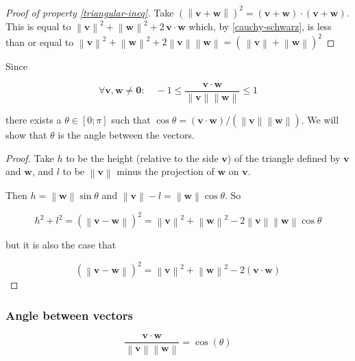 \documentclass[12pt,a4paper]{report}
\newcommand{\norm}[1]{\left\lVert#1\right\rVert}
\numberwithin{equation}{section}
\theoremstyle{definition}
\theoremstyle{remark}
\begin{document}
\begin{proof}[Proof of property \ref{triangular-ineq}]
Take $(\norm{\mathbf{v}+\mathbf{w}})^2 = (\mathbf{v} +\mathbf{w}) \cdot (\mathbf{v} +\mathbf{w})$. This is equal to $\norm{\mathbf{v}}^2 + \norm{\mathbf{w}}^2 + 2\, \mathbf{v}\cdot \mathbf{w}$ which, by \eqref{cauchy-schwarz}, is less than or equal to $\norm{\mathbf{v}}^2 + \norm{\mathbf{w}}^2 + 2 \norm{\mathbf{v}}\norm{\mathbf{w}} = (\,\norm{\mathbf{v}}+\norm{\mathbf{w}})^2$
\end{proof}

Since

\begin{equation}
\forall \mathbf{v}, \mathbf{w} \neq \mathbf{0}: \quad -1 \leq \frac{\mathbf{v} \cdot \mathbf{w}}{\norm{\mathbf{v}}\norm{\mathbf{w}}}\leq 1
\end{equation}

there exists a $\theta\in [0;\pi]$ such that $\cos \theta = (\mathbf{v} \cdot \mathbf{w})/(\norm{\mathbf{v}}\norm{\mathbf{w}})$. We will show that $\theta$ is the angle between the vectors.

\begin{proof}
Take $h$ to be the height (relative to the side $\mathbf{v}$) of the triangle defined by $\mathbf{v}$ and $\mathbf{w}$, and $l$ to be $\norm{\mathbf{v}}$ minus the projection of $\mathbf{w}$ on $\mathbf{v}$.

Then $h = \norm{\mathbf{w}}\sin\theta$ and $\norm{\mathbf{v}}-l = \norm{\mathbf{w}}\cos \theta$. So

\begin{equation}
h^2 + l^2 = (\norm{\mathbf{v} - \mathbf{w}})^2 = \norm{\mathbf{v}}^2 + \norm{\mathbf{w}}^2 -2 \norm{\mathbf{v}} \norm{\mathbf{w}} \cos \theta
\end{equation}

but it is also the case that

\begin{equation}
(\norm{\mathbf{v} - \mathbf{w}})^2 = \norm{\mathbf{v}}^2 + \norm{\mathbf{w}}^2 -2 (\mathbf{v}\cdot \mathbf{w})
\end{equation}
\end{proof}

\subsubsection{Angle between vectors}

\begin{equation}
\frac{\mathbf{v}\cdot \mathbf{w}}{\norm{\mathbf{v}}\norm{\mathbf{w}}} = \cos (\theta) \label{cos-angle-scalarproduct}
\end{equation}
\end{document}
